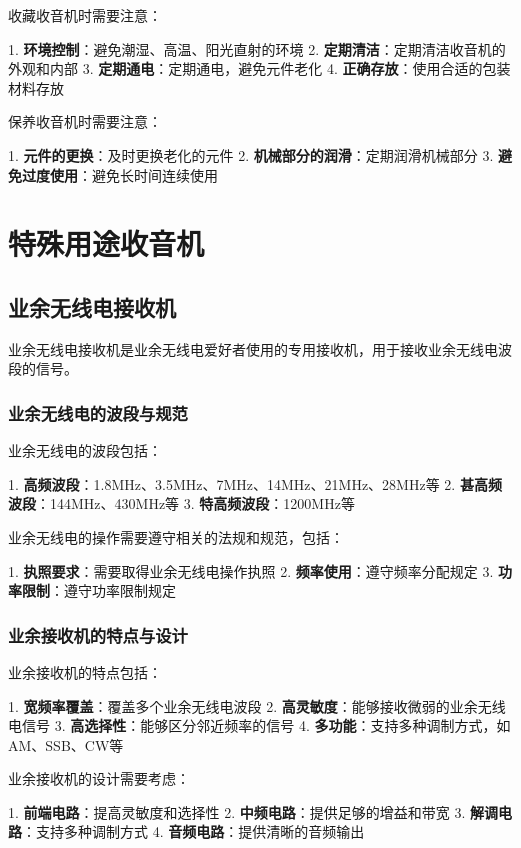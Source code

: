 \documentclass[12pt,UTF8]{ctexbook}
\begin{document}
收藏收音机时需要注意：

1. \textbf{环境控制}：避免潮湿、高温、阳光直射的环境
2. \textbf{定期清洁}：定期清洁收音机的外观和内部
3. \textbf{定期通电}：定期通电，避免元件老化
4. \textbf{正确存放}：使用合适的包装材料存放

保养收音机时需要注意：

1. \textbf{元件的更换}：及时更换老化的元件
2. \textbf{机械部分的润滑}：定期润滑机械部分
3. \textbf{避免过度使用}：避免长时间连续使用

\part{特殊用途收音机}

\chapter{业余无线电接收机}

业余无线电接收机是业余无线电爱好者使用的专用接收机，用于接收业余无线电波段的信号。

\section{业余无线电的波段与规范}

业余无线电的波段包括：

1. \textbf{高频波段}：1.8MHz、3.5MHz、7MHz、14MHz、21MHz、28MHz等
2. \textbf{甚高频波段}：144MHz、430MHz等
3. \textbf{特高频波段}：1200MHz等

业余无线电的操作需要遵守相关的法规和规范，包括：

1. \textbf{执照要求}：需要取得业余无线电操作执照
2. \textbf{频率使用}：遵守频率分配规定
3. \textbf{功率限制}：遵守功率限制规定

\section{业余接收机的特点与设计}

业余接收机的特点包括：

1. \textbf{宽频率覆盖}：覆盖多个业余无线电波段
2. \textbf{高灵敏度}：能够接收微弱的业余无线电信号
3. \textbf{高选择性}：能够区分邻近频率的信号
4. \textbf{多功能}：支持多种调制方式，如AM、SSB、CW等

业余接收机的设计需要考虑：

1. \textbf{前端电路}：提高灵敏度和选择性
2. \textbf{中频电路}：提供足够的增益和带宽
3. \textbf{解调电路}：支持多种调制方式
4. \textbf{音频电路}：提供清晰的音频输出
\end{document}
